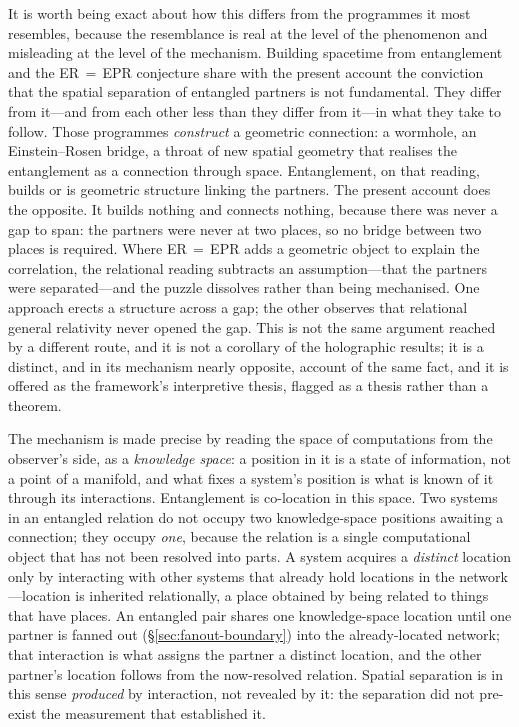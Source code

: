 It is worth being exact about how this differs from the programmes it most
resembles, because the resemblance is real at the level of the phenomenon and
misleading at the level of the mechanism. Building spacetime from entanglement
\autocite{VanRaamsdonk2010} and the ER\,$=$\,EPR conjecture
\autocite{MaldacenaSusskind2013} share with the present account the conviction
that the spatial separation of entangled partners is not fundamental. They differ
from it---and from each other less than they differ from it---in what they take to
follow. Those programmes \emph{construct} a geometric connection: a wormhole, an
Einstein--Rosen bridge, a throat of new spatial geometry that realises the
entanglement as a connection through space. Entanglement, on that reading, builds
or is geometric structure linking the partners. The present account does the
opposite. It builds nothing and connects nothing, because there was never a gap to
span: the partners were never at two places, so no bridge between two places is
required. Where ER\,$=$\,EPR adds a geometric object to explain the correlation,
the relational reading subtracts an assumption---that the partners were
separated---and the puzzle dissolves rather than being mechanised. One approach
erects a structure across a gap; the other observes that relational general
relativity never opened the gap. This is not the same argument reached by a
different route, and it is not a corollary of the holographic results; it is a
distinct, and in its mechanism nearly opposite, account of the same fact, and it
is offered as the framework's interpretive thesis, flagged as a thesis rather than
a theorem.

The mechanism is made precise by reading the space of computations from the
observer's side, as a \emph{knowledge space}: a position in it is a state of
information, not a point of a manifold, and what fixes a system's position is what
is known of it through its interactions. Entanglement is co-location in this
space. Two systems in an entangled relation do not occupy two knowledge-space
positions awaiting a connection; they occupy \emph{one}, because the relation is a
single computational object that has not been resolved into parts. A system
acquires a \emph{distinct} location only by interacting with other systems that
already hold locations in the network---location is inherited relationally, a
place obtained by being related to things that have places. An entangled pair
shares one knowledge-space location until one partner is fanned out
(\S\ref{sec:fanout-boundary}) into the already-located network; that interaction
is what assigns the partner a distinct location, and the other partner's location
follows from the now-resolved relation. Spatial separation is in this sense
\emph{produced} by interaction, not revealed by it: the separation did not
pre-exist the measurement that established it.

